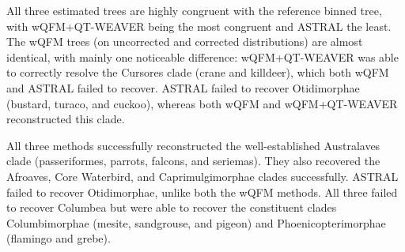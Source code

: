 \documentclass[10pt,a4paper]{article}
\begin{document}



All three estimated trees are highly congruent with the reference binned tree, with wQFM+QT-WEAVER being the most congruent and ASTRAL the least. %
The wQFM trees (on uncorrected and corrected distributions) are almost identical, with mainly one noticeable difference: wQFM+QT-WEAVER was able to correctly resolve the Cursores clade (crane and killdeer), which both wQFM and ASTRAL failed to recover. ASTRAL failed to recover Otidimorphae (bustard, turaco, and cuckoo), whereas both wQFM and wQFM+QT-WEAVER reconstructed this clade.

All three methods successfully reconstructed the well-established Australaves clade (passeriformes, parrots, falcons, and seriemas). They also recovered the Afroaves, Core Waterbird, and Caprimulgimorphae clades successfully.
ASTRAL failed to recover Otidimorphae, unlike both the wQFM methods.  All three failed to recover Columbea but were able to recover the constituent clades Columbimorphae (mesite, sandgrouse, and pigeon) and Phoenicopterimorphae (flamingo and grebe).

\end{document}
